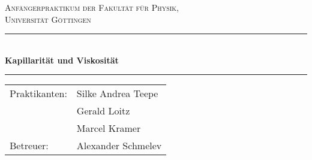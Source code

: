 \begin{titlepage}
\centering
\textsc{\Large Anfängerpraktikum der Fakultät für
  Physik,\\[1.5ex] Universität Göttingen}

\vspace*{4.2cm}

\rule{\textwidth}{1pt}\\[0.5cm]
{\huge \bfseries
  Kapillarität und Viskosität}\\[0.5cm]
\rule{\textwidth}{1pt}

\vspace*{3.5cm}

\begin{Large}
\begin{tabular}{ll}
Praktikanten: &  Silke Andrea Teepe\\
& Gerald Loitz \\
& Marcel Kramer\\
Betreuer: & Alexander Schmelev\\
\end{tabular}
\end{Large}

\vspace*{0.8cm}

\begin{Large}
\end{Large}

\end{titlepage}